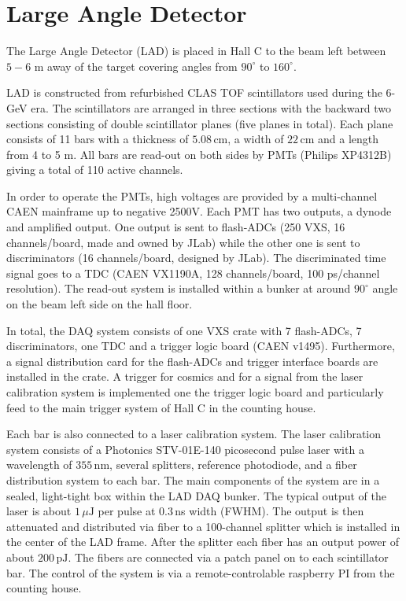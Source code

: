   

\section{Large Angle Detector}

The Large Angle Detector (LAD) is placed in Hall C to the beam left between $5-6$ m away of the target covering angles from $90^{\circ}$ to $160^{\circ}$. 
 
LAD is constructed from refurbished CLAS TOF scintillators used during the 6-GeV era. The scintillators are arranged in three sections with the backward two sections consisting of double scintillator planes (five planes in total).  Each plane consists of 11 bars with a thickness of $5.08\,\mathrm{cm}$, a width of $22\,\mathrm{cm}$ and a length from 4 to 5 m.
All bars are read-out on both sides by PMTs (Philips XP4312B) giving a total of 110 active channels. 

In order to operate the PMTs,  high voltages are provided by a multi-channel CAEN mainframe up to negative 2500V.
Each PMT has two outputs,  a dynode and amplified output.  One output is sent to flash-ADCs (250 VXS,  16 channels/board,  made and owned by JLab) while the other one is sent to discriminators (16 channels/board,  designed by JLab).
The discriminated time signal goes to a TDC (CAEN VX1190A, 128 channels/board, 100 ps/channel resolution).  The read-out system is installed within a bunker at around $90^{\circ}$ angle on the beam left side on the hall floor.

In total,  the DAQ system consists of one VXS crate with 7 flash-ADCs,  7 discriminators,  one TDC and a trigger logic board (CAEN v1495).  Furthermore,  a signal distribution card for the flash-ADCs and trigger interface boards are installed in the crate.  A trigger for cosmics and for a signal from the laser calibration system is implemented one the trigger logic board and particularly feed to the main trigger system of Hall C in the counting house.

Each bar is also connected to a laser calibration system.
The laser calibration system consists of a Photonics STV-01E-140 picosecond pulse laser with a
wavelength of $355\,\mathrm{nm}$,  several splitters,  reference photodiode,  and a fiber distribution
system to each bar.  The main components of the system are in a sealed,  light-tight box within the LAD DAQ bunker.  The typical output of the laser is about $1\,\mu\mathrm{J}$ per pulse at $0.3\,$ns width (FWHM).  The output is then attenuated and distributed via fiber to a 100-channel splitter which is installed in the center of the LAD frame.  After the splitter each fiber has an output power of about $200\,\mathrm{pJ}$.  The fibers are connected via a patch panel on to each scintillator bar. The control of the system is via a remote-controlable raspberry PI from the counting house.


